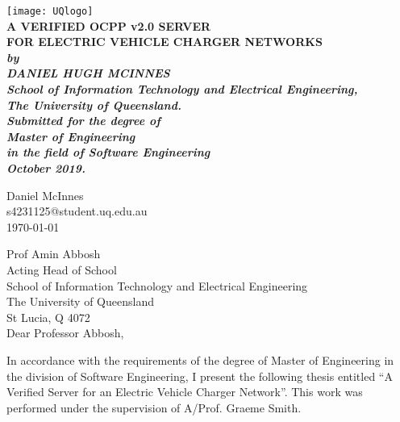 \documentclass[12pt,openany,a4paper]{book}
\renewcommand{\baselinestretch}{1.2}	%
\begin{document}
\frontmatter

\begin{titlepage}
\renewcommand{\baselinestretch}{1.0}
\begin{center}
\texttt{[image: UQlogo]}\\
\vspace*{35mm}
\Huge\bf
		A VERIFIED OCPP v2.0 SERVER\\
		FOR ELECTRIC VEHICLE CHARGER NETWORKS\\
\vspace{20mm}
\large\sl
		by\\
		DANIEL HUGH MCINNES
		\medskip\\
\rm
		School of Information Technology and Electrical Engineering,\\
		The University of Queensland.\\
\vspace{30mm}
		Submitted for the degree of\\
		Master of Engineering
		\smallskip\\
\normalsize
		in the field of Software Engineering
		\medskip\\
\large
		October 2019.		
\end{center}
\end{titlepage}

\cleardoublepage

\begin{flushright}
	Daniel McInnes\\
	s4231125@student.uq.edu.au\\
	\medskip
	\today
\end{flushright}
\begin{flushleft}
  Prof Amin Abbosh\\
  Acting Head of School\\
  School of Information Technology and Electrical Engineering\\
  The University of Queensland\\
  St Lucia, Q 4072\\
  \bigskip\bigskip
  Dear Professor Abbosh,
\end{flushleft}

In accordance with the requirements of the degree of Master of
Engineering in the division of 
Software Engineering,
I present the
following thesis entitled ``A Verified Server for an Electric Vehicle Charger Network''.  This work was performed under the supervision of A/Prof. Graeme Smith.
\end{document}
